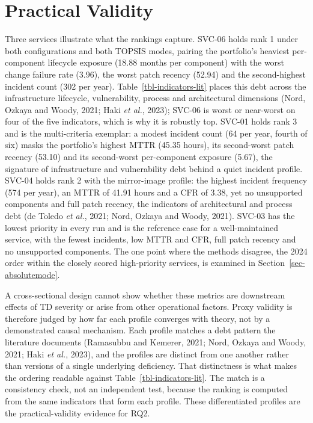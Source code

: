 \documentclass[
  12pt,
  letterpaper,
  12pt,
  oneside,
  english,
  onehalfspacing,
  headsepline]{MastersDoctoralThesis}
\begin{document}
\section{Practical Validity}\label{sec-practicalvalidity}

Three services illustrate what the rankings capture. SVC-06 holds rank 1
under both configurations and both TOPSIS modes, pairing the portfolio's
heaviest per-component lifecycle exposure (18.88 months per component)
with the worst change failure rate (3.96), the worst patch recency
(52.94) and the second-highest incident count (302 per year).
Table~\ref{tbl-indicators-lit} places this debt across the
infrastructure lifecycle, vulnerability, process and architectural
dimensions (Nord, Ozkaya and Woody, 2021; Haki \emph{et al.}, 2023);
SVC-06 is worst or near-worst on four of the five indicators, which is
why it is robustly top. SVC-01 holds rank 3 and is the multi-criteria
exemplar: a modest incident count (64 per year, fourth of six) masks the
portfolio's highest MTTR (45.35 hours), its second-worst patch recency
(53.10) and its second-worst per-component exposure (5.67), the
signature of infrastructure and vulnerability debt behind a quiet
incident profile. SVC-04 holds rank 2 with the mirror-image profile: the
highest incident frequency (574 per year), an MTTR of 41.91 hours and a
CFR of 3.38, yet no unsupported components and full patch recency, the
indicators of architectural and process debt (de Toledo \emph{et al.},
2021; Nord, Ozkaya and Woody, 2021). SVC-03 has the lowest priority in
every run and is the reference case for a well-maintained service, with
the fewest incidents, low MTTR and CFR, full patch recency and no
unsupported components. The one point where the methods disagree, the
2024 order within the closely scored high-priority services, is examined
in Section~\ref{sec-absolutemode}.

A cross-sectional design cannot show whether these metrics are
downstream effects of TD severity or arise from other operational
factors. Proxy validity is therefore judged by how far each profile
converges with theory, not by a demonstrated causal mechanism. Each
profile matches a debt pattern the literature documents (Ramasubbu and
Kemerer, 2021; Nord, Ozkaya and Woody, 2021; Haki \emph{et al.}, 2023),
and the profiles are distinct from one another rather than versions of a
single underlying deficiency. That distinctness is what makes the
ordering readable against Table~\ref{tbl-indicators-lit}. The match is a
consistency check, not an independent test, because the ranking is
computed from the same indicators that form each profile. These
differentiated profiles are the practical-validity evidence for RQ2.
\end{document}
